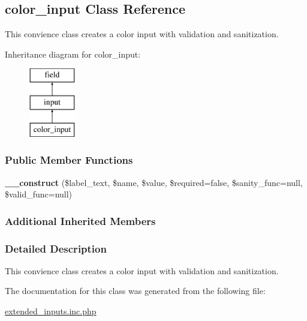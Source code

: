 \hypertarget{classcolor__input}{\subsection{color\-\_\-input Class Reference}
\label{classcolor__input}
}


This convience class creates a color input with validation and sanitization.  


Inheritance diagram for color\-\_\-input\-:\begin{figure}[H]
\begin{center}
\leavevmode
\includegraphics[height=3.000000cm]{classcolor__input}
\end{center}
\end{figure}
\subsubsection*{Public Member Functions}
\begin{DoxyCompactItemize}
\item 
\hypertarget{classcolor__input_ae7453daef5e053547d9ddb3c55ad4e1d}{{\bfseries \-\_\-\-\_\-construct} (\$label\-\_\-text, \$name, \$value, \$required=false, \$sanity\-\_\-func=null, \$valid\-\_\-func=null)}\label{classcolor__input_ae7453daef5e053547d9ddb3c55ad4e1d}

\end{DoxyCompactItemize}
\subsubsection*{Additional Inherited Members}


\subsubsection{Detailed Description}
This convience class creates a color input with validation and sanitization. 

The documentation for this class was generated from the following file\-:\begin{DoxyCompactItemize}
\item 
\hyperlink{extended__inputs_8inc_8php}{extended\-\_\-inputs.\-inc.\-php}\end{DoxyCompactItemize}
